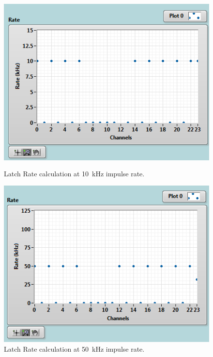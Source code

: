 \begin{figure}[H]
	\centering
	\begin{minipage}{0.49\textwidth}
		\centering
		\includegraphics[width=.95\linewidth]{IMG/ch5/latch_tests/fig3.PNG}
		\caption{Latch Rate calculation at 10~kHz impulse rate.}
		\label{fig:latchrate10}
	\end{minipage}%
	\begin{minipage}{0.49\textwidth}
		\centering
		\includegraphics[width=.95\linewidth]{IMG/ch5/latch_tests/fig5.PNG}
		\caption{Latch Rate calculation at 50~kHz impulse rate.}
		\label{fig:latchrate50}
	\end{minipage}
\end{figure}

